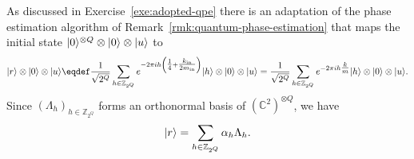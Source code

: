\documentclass[a4paper, oneside, 12pt]{amsart}
\begin{document}
\begin{remark}
  As discussed in Exercise~\ref{exe:adopted-qpe} there is an adaptation of the phase estimation algorithm of Remark~\ref{rmk:quantum-phase-estimation}  that maps the  initial state \(\lvert0\rangle^{\otimes Q} \otimes \lvert0\rangle \otimes \lvert u\rangle\) to
  \begin{equation*}
    \ket{r} \otimes  \ket{0} \otimes \ket{u}
    \eqdef \frac{1}{\sqrt{2^Q}}\sum_{h\in \mathbb{Z}_{2^{Q}}} e^{-2\pi i h \left(\tfrac{1}{4} +\tfrac{k_{\mathrm{in}}}{2m_{\mathrm{in}}}\right)}\ket{h} \otimes  \ket{0} \otimes \ket{u}
    = \frac{1}{\sqrt{2^Q}}\sum_{h\in \mathbb{Z}_{2^{Q}}} e^{-2\pi i h \tfrac{k}{m}}\ket{h} \otimes  \ket{0} \otimes \ket{u}.
  \end{equation*}
  Since \((\Lambda_{h})_{h\in \mathbb{Z}_{2^{Q}}}\) forms an orthonormal basis of \( ( \mathbb{C}^{2})^{\otimes Q}\), we have
  \begin{equation*}
    \lvert r\rangle = \sum_{h\in \mathbb{Z}_{2^{Q}}} \alpha_{h} \Lambda_{h}.
  \end{equation*}


\end{remark}
\end{document}
